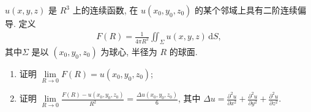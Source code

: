 \documentclass[../../main.tex]{subfiles}%
\begin{document}
\begin{example}
\(u(x, y, z)\) 是 \(R^3\) 上的连续函数, 在 \(u(x_0, y_0, z_0)\) 的某个邻域上具有二阶连续偏导. 定义
\begin{align*}
F(R) = \frac{1}{4\pi R^2} \iint_{\Sigma} u(x, y, z)\, \mathrm{d}S,
\end{align*}
其中\(\Sigma\) 是以 \((x_0, y_0, z_0)\) 为球心, 半径为 \(R\) 的球面.
\begin{enumerate}[(1)]
\item 证明 \(\lim\limits_{R \to 0} F(R) = u(x_0, y_0, z_0)\);
\item 证明 \(\lim\limits_{R \to 0} \frac{F(R) - u(x_0, y_0, z_0)}{R^2} = \frac{\Delta u(x_0, y_0, z_0)}{6}\), 其中 \(\Delta u = \frac{\partial^2 u}{\partial x^2} + \frac{\partial^2 u}{\partial y^2} + \frac{\partial^2 u}{\partial z^2}\).
\end{enumerate}
\end{example}
\end{document}

